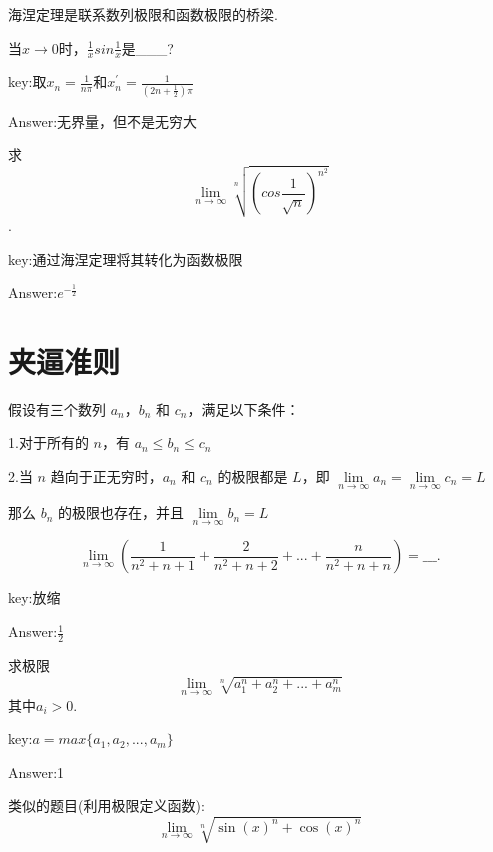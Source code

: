 \documentclass[12pt, a4paper, oneside]{ctexbook}
\begin{document}
海涅定理是联系数列极限和函数极限的桥梁.

\hspace*{\fill}

当$x \to 0$时，$\frac{1}{x}sin\frac{1}{x}$是\_\_\_?

key:取$x_n=\frac{1}{n\pi}$和$x^{'}_n=\frac{1}{(2n+\frac{1}{2})\pi}$

Answer:无界量，但不是无穷大

\hspace*{\fill}


求\[\lim\limits_{n \to \infty}\sqrt[n]{(cos\frac{1}{\sqrt{n}})^{n^2}}\].

key:通过海涅定理将其转化为函数极限

Answer:$e^{-\frac{1}{2}}$

\hspace*{\fill}


\section{夹逼准则}

假设有三个数列 ${a_n}$，${b_n}$ 和 ${c_n}$，满足以下条件：

1.对于所有的 $n$，有 $a_n \leq b_n \leq c_n$

2.当 $n$ 趋向于正无穷时，${a_n}$ 和 ${c_n}$ 的极限都是 $L$，即 $\lim\limits_{n \to \infty} a_n = \lim\limits_{n \to \infty} c_n = L$

那么 ${b_n}$ 的极限也存在，并且 $\lim\limits_{n \to \infty} b_n = L$

\hspace*{\fill}

\[\lim\limits_{n \to \infty}(\frac{1}{n^2+n+1}+\frac{2}{n^2+n+2}+...+\frac{n}{n^2+n+n})=\_\_\_.\]

key:放缩

Answer:$\frac{1}{2}$

\hspace*{\fill}

求极限\[\lim\limits_{n \to \infty}\sqrt[n]{a_1^n+a_2^n+...+a_m^n}\]
其中$a_i>0$.

key:$a=max\{a_1,a_2,...,a_m\}$

Answer:1

\hspace*{\fill}

类似的题目(利用极限定义函数):\[\lim\limits_{n \to \infty}\sqrt[n]{\sin(x)^n+\cos(x)^n}\]

\hspace*{\fill}
\end{document}
